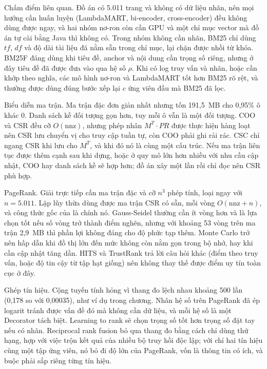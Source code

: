 \documentclass[9pt,twocolumn,a4paper]{extarticle}
\begin{document}
Chấm điểm liên quan. Đồ án có 5.011 trang và không có dữ liệu nhãn, nên mọi hướng cần huấn luyện (LambdaMART, bi-encoder, cross-encoder) đều không dùng được ngay, và hai nhóm nơ-ron còn cần GPU và một chỉ mục vector mà đồ án tự cài bằng Java thì không có. Trong nhóm không cần nhãn, BM25 chỉ dùng $tf$, $df$ và độ dài tài liệu đã nằm sẵn trong chỉ mục, lại chặn được nhồi từ khóa. BM25F đáng dùng khi tiêu đề, anchor và nội dung cần trọng số riêng, nhưng ở đây tiêu đề đã được đưa vào qua hệ số $\rho$. Khi có log truy vấn và nhãn, hoặc cần khớp theo nghĩa, các mô hình nơ-ron và LambdaMART tốt hơn BM25 rõ rệt, và thường được dùng đúng bước xếp lại $c$ ứng viên đầu mà BM25 đã lọc.

Biểu diễn ma trận. Ma trận đặc đơn giản nhất nhưng tốn 191,5~MB cho 0,95\% ô khác 0. Danh sách kề đối tượng gọn hơn, tuy mỗi ô vẫn là một đối tượng. COO và CSR đều cỡ $O(\text{nnz})$, nhưng phép nhân $M^{T}\!\cdot PR$ được thực hiện hàng loạt nên CSR lưu chuyển vị cho truy cập tuần tự, còn COO phải ghi rải rác. CSC chỉ ngang CSR khi lưu cho $M^{T}$, và khi đó nó là cùng một cấu trúc. Nếu ma trận liên tục được thêm cạnh sau khi dựng, hoặc ở quy mô lớn hơn nhiều với nhu cầu cập nhật, COO hay danh sách kề sẽ hợp hơn; đồ án xây một lần rồi chỉ đọc nên CSR phù hợp.

PageRank. Giải trực tiếp cần ma trận đặc và cỡ $n^3$ phép tính, loại ngay với $n=5.011$. Lặp lũy thừa dùng được ma trận CSR có sẵn, mỗi vòng $O(\text{nnz}+n)$, và công thức gốc của \cite{brin1998} là chính nó. Gauss-Seidel thường cần ít vòng hơn và là lựa chọn tốt nếu số vòng trở thành điểm nghẽn, nhưng với khoảng 53 vòng trên ma trận 2,9~MB thì phần lợi không đáng cho độ phức tạp thêm. Monte Carlo trở nên hấp dẫn khi đồ thị lớn đến mức không còn nằm gọn trong bộ nhớ, hay khi cần cập nhật tăng dần. HITS và TrustRank trả lời câu hỏi khác (điểm theo truy vấn, hoặc độ tin cậy từ tập hạt giống) nên không thay thế được điểm uy tín toàn cục ở đây.

Ghép tín hiệu. Cộng tuyến tính hỏng vì thang đo lệch nhau khoảng 500 lần (0,178 so với 0,00035), như ví dụ trong chương. Nhân hệ số trên PageRank đã ép logarit tránh được vấn đề đó mà không cần dữ liệu, và mỗi hệ số là một Decorator tách biệt. Learning to rank sẽ chọn trọng số tốt hơn trọng số đặt tay nếu có nhãn. Reciprocal rank fusion bỏ qua thang đo bằng cách chỉ dùng thứ hạng, hợp với việc trộn kết quả của nhiều bộ truy hồi độc lập; với chỉ hai tín hiệu cùng một tập ứng viên, nó bỏ đi độ lớn của PageRank, vốn là thông tin có ích, và buộc phải sắp riêng từng tín hiệu.
\end{document}

